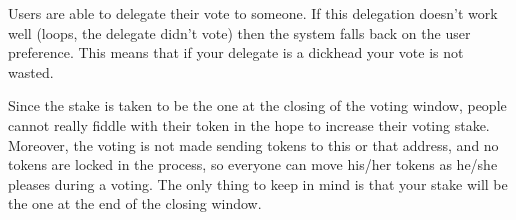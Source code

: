 \documentclass[submission, copyright,creativecommons,sharealike,noncommercial]{eptcs}
\begin{document}
		Users are able to delegate their vote to someone. If this delegation doesn't work well (loops, the delegate didn't vote) then the system falls back on the user preference. This means that if your delegate is a dickhead your vote is not wasted.
		
		Since the stake is taken to be the one at the closing of the voting window, people cannot really fiddle with their token in the hope to increase their voting stake. Moreover, the voting is not made sending tokens to this or that address, and no tokens are locked in the process, so everyone can move his/her tokens as he/she pleases during a voting. The only thing to keep in mind is that your stake will be the one at the end of the closing window.
		
		
\end{document}
